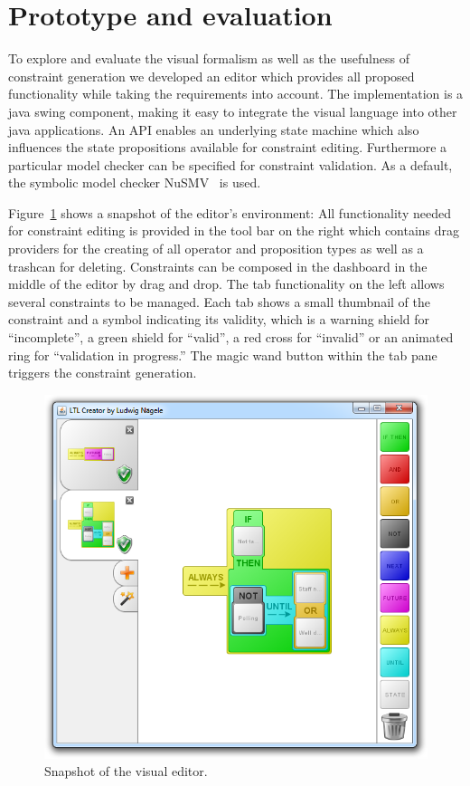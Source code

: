 \documentclass[conference]{IEEEtran}
\begin{document}
\section{Prototype and evaluation}

To explore and evaluate the visual formalism as well as the usefulness of constraint generation we developed an editor which provides all proposed functionality while taking the requirements into account.
The implementation is a java swing component, making it easy to integrate the visual language into other java applications. An API enables an underlying state machine which also influences the state propositions available for constraint editing. Furthermore a particular model checker can be specified for constraint validation. As a default, the symbolic model checker NuSMV~\cite{springerlink:10.1007/s100090050046,NuSMV2} is used.

Figure~\ref{fig:editor} shows a snapshot of the editor's environment: All functionality needed for constraint editing is provided in the tool bar on the right which contains drag providers for the creating of all operator and proposition types as well as a trashcan for deleting. Constraints can be composed in the dashboard in the middle of the editor by drag and drop. The tab functionality on the left allows several constraints to be managed. Each tab shows a small thumbnail of the constraint and a symbol indicating its validity, which is a warning shield for ``incomplete'', a green shield for ``valid'', a red cross for ``invalid'' or an animated ring for ``validation in progress.'' The magic wand button within the tab pane triggers the constraint generation.

\begin{figure}[htbp]
  \centering
  \includegraphics[width=\linewidth]{editor} 
  \caption{Snapshot of the visual editor.}
  \label{fig:editor}
\end{figure}
\end{document}
